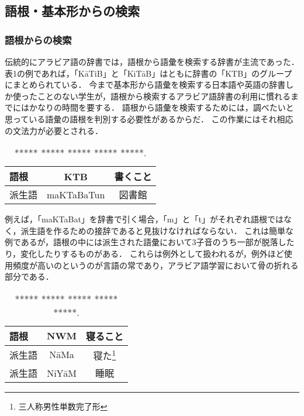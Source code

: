\documentclass[technicalreport]{ieicej}
\begin{document}
\subsection{語根・基本形からの検索}
\subsubsection{語根からの検索}
伝統的にアラビア語の辞書では，語根から語彙を検索する辞書が主流であった．
表1の例であれば，「KāTiB」と「KiTāB」はともに辞書の「KTB」のグループにまとめられている．
今まで基本形から語彙を検索する日本語や英語の辞書しか使ったことのない学生が，語根から検索するアラビア語辞書の利用に慣れるまでにはかなりの時間を要する．
語根から語彙を検索するためには，調べたいと思っている語彙の語根を判別する必要性があるからだ．
この作業にはそれ相応の文法力が必要とされる．

\begin{table}[ht]
\begin{center}
\begin{tabular}{l|cc}
   語根& KTB & 書くこと\\
  \hline
 派生語& maKTaBaTun & 図書館\\
\hline
\end{tabular}
\caption{***** ***** ***** ***** *****.}
\label{table:alignment}
\end{center}
\end{table}
例えば，「maKTaBat」を辞書で引く場合，「m」と「t」がそれぞれ語根ではなく，派生語を作るための接辞であると見抜けなければならない．
これは簡単な例であるが，語根の中には派生された語彙において3子音のうち一部が脱落したり，変化したりするものがある．
これらは例外として扱われるが，例外ほど使用頻度が高いのというのが言語の常であり，アラビア語学習において骨の折れる部分である．

\begin{table}[ht]
\begin{center}
\begin{tabular}{l|cc}
   語根& NWM & 寝ること\\
  \hline
 派生語& NāMa & 寝た\footnote{三人称男性単数完了形}\\
  派生語& NiYāM & 睡眠\\
\hline
\end{tabular}
\caption{***** ***** ***** ***** *****.}
\label{table:alignment}
\end{center}
\end{table}
\end{document}
